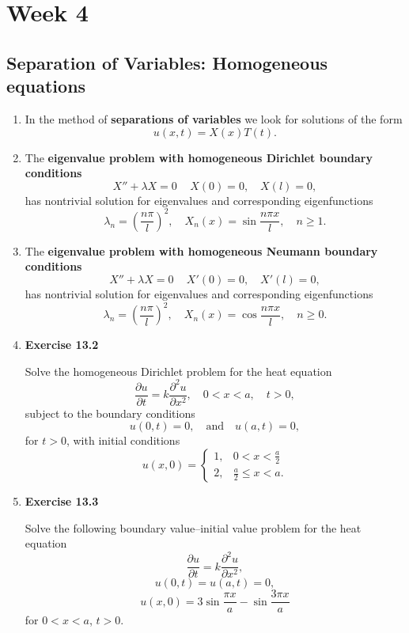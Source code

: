\chapter{Week 4}
\setcounter{weekpage}{1}
\thispagestyle{plainweek}

\section[Separation of Variables]{Separation of Variables: Homogeneous equations}

\begin{enumerate}



\item In the method of \textbf{separations of variables} we look for solutions of the form
\[u(x,t)=X(x)T(t).\]


\item The \textbf{eigenvalue problem with homogeneous Dirichlet boundary conditions}
\[X''+\lambda X = 0 \, \quad X(0)=0, \quad X(l)=0,\]
has nontrivial solution for eigenvalues and corresponding eigenfunctions
\[\lambda_{n} = \left(\frac{n\pi}{l}\right)^{2}, \quad  X_{n}(x)= \sin \frac{n\pi x}{l}, \quad n\geq 1.\]


\item The \textbf{eigenvalue problem with homogeneous Neumann boundary conditions}
\[X''+\lambda X = 0 \, \quad X'(0)=0, \quad X'(l)=0,\]
has nontrivial solution for eigenvalues and corresponding eigenfunctions
\[\lambda_{n} = \left(\frac{n\pi}{l}\right)^{2}, \quad  X_{n}(x)= \cos \frac{n\pi x}{l}, \quad n\geq 0.\]


\newpage

\item \textbf{Exercise 13.2}

Solve the homogeneous Dirichlet problem for the heat equation
\[\frac{\partial u}{\partial t} = k \frac{\partial^{2}u}{\partial x^{2}}, \quad 0< x < a, \quad t>0,\]
subject to the boundary conditions
\[u(0,t)=0, \quad \text{and} \quad u(a,t)=0,\]
for $t > 0$, with initial conditions
\[u(x,0)=
\begin{cases}
    1, & 0<x<\frac{a}{2} \\
    2, & \frac{a}{2} \leq x< a.
\end{cases}
\]


\newpage


\item \textbf{Exercise 13.3}

Solve the following boundary value--initial value problem for the heat equation
\[\frac{\partial u}{\partial t} = k \frac{\partial^{2}u}{\partial x^{2}},\]
\[u(0,t)=u(a,t)=0,\]
\[u(x,0)=3 \sin \frac{\pi x}{a} - \sin \frac{3\pi x}{a}
\]
for $0<x<a$, $t > 0$.



\end{enumerate}
